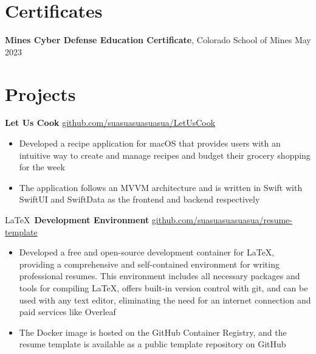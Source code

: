 \documentclass[11pt]{article}       %
\begin{document}
\vspace{-18.5pt}

\section*{Certificates}
\textbf{Mines Cyber Defense Education Certificate}, {Colorado School of Mines} \hfill May 2023 \\

\vspace{-6.5pt}

\section*{Projects}
\textbf{Let Us Cook} \hfill \href{https://github.com/suasuasuasuasua/LetUsCook}{github.com/suasuasuasuasua/LetUsCook} \\
\vspace{-9pt}
\begin{itemize}
  \item Developed a recipe application for macOS that provides users with an
        intuitive way to create and manage recipes and budget their grocery shopping
        for the week
  \item The application follows an MVVM architecture and is written in Swift
        with SwiftUI and SwiftData as the frontend and backend respectively
\end{itemize}

\LaTeX \, \textbf{Development Environment} \hfill
\href{https://github.com/suasuasuasuasua/resume-template}{github.com/suasuasuasuasua/resume-template}
\\
\vspace{-9pt}
\begin{itemize}
  \item Developed a free and open-source development container for \LaTeX,
        providing a comprehensive and self-contained environment for writing
        professional resumes. This environment includes all necessary packages
        and tools for compiling \LaTeX, offers built-in version control with
        git, and can be used with any text editor, eliminating the need for an
        internet connection and paid services like Overleaf
  \item The Docker image is hosted on the
        GitHub Container Registry, and the resume template is available as a
        public template repository on GitHub
\end{itemize}
\end{document}

